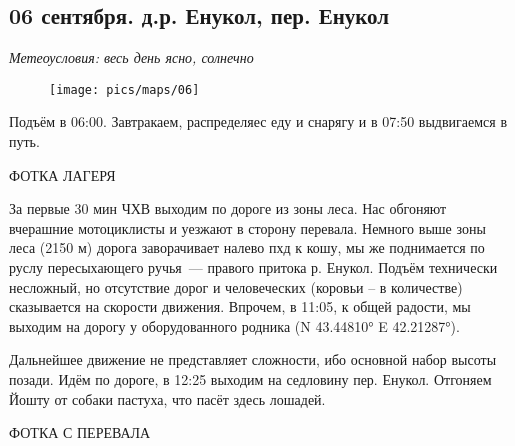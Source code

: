 \subsection{06 сентября. д.р. Енукол, пер. Енукол}
\textit{Метеоусловия: весь день ясно, солнечно}

\begin{figure}[h!]
	\centering
	\texttt{[image: pics/maps/06]}
	\label{fig:06}
\end{figure}

Подъём в 06:00. Завтракаем, распределяес еду и снарягу и в 07:50 выдвигаемся в путь.

\alert{ФОТКА ЛАГЕРЯ}

За первые 30 мин ЧХВ выходим по дороге из зоны леса. Нас обгоняют вчерашние мотоциклисты и уезжают в сторону перевала. Немного выше зоны леса (2150 м) дорога заворачивает налево пхд к кошу, мы же поднимается по руслу пересыхающего ручья~--- правого притока р. Енукол. Подъём технически несложный, но отсутствие дорог и человеческих (коровьи -- в количестве) сказывается на скорости движения. Впрочем, в 11:05, к общей радости, мы выходим на дорогу у оборудованного родника (N 43.44810° E 42.21287°).

Дальнейшее движение не представляет сложности, ибо основной набор высоты позади. Идём по дороге, в 12:25 выходим на седловину пер. Енукол. Отгоняем Йошту от собаки пастуха, что пасёт здесь лошадей.

\alert{ФОТКА С ПЕРЕВАЛА}






\clearpage